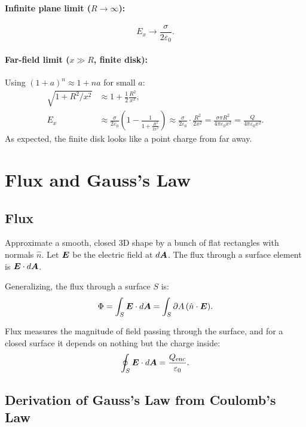 \begin{example}
\paragraph{Infinite plane limit ($R\to\infty$):}
\[
    E_x \to \frac{\sigma}{2\varepsilon_0}.
\]

\paragraph{Far-field limit ($x \gg R$, finite disk):}
Using $(1+a)^n \approx 1 + na$ for small $a$:
\begin{align*}
    \sqrt{1+R^2/x^2} &\approx 1 + \frac{1}{2}\frac{R^2}{x^2}, \\
    E_x &\approx \frac{\sigma}{2\varepsilon_0}\left(1 - \frac{1}{1 + \frac{R^2}{2x^2}}\right)
          \approx \frac{\sigma}{2\varepsilon_0}\cdot\frac{R^2}{2x^2}
          = \frac{\sigma \pi R^2}{4\pi\varepsilon_0 x^2}
          = \frac{Q}{4\pi\varepsilon_0 x^2}.
\end{align*}
As expected, the finite disk looks like a point charge from far away.
\end{example}

\section{Flux and Gauss's Law}

\subsection{Flux}

\begin{definition}
Approximate a smooth, closed 3D shape by a bunch of flat rectangles with normals $\hat{n}$. Let $\vect{E}$ be the electric field at $d\vect{A}$. The flux through a surface element is $\vect{E}\cdot d\vect{A}$.

Generalizing, the flux through a surface $S$ is:
\[
    \Phi = \int_S \vect{E}\cdot d\vect{A} = \int_S \partial A\,(\hat{n}\cdot\vect{E}).
\]
\end{definition}

Flux measures the magnitude of field passing through the surface, and for a closed surface it depends on nothing but the charge inside:
\[
    \oint_S \vect{E}\cdot d\vect{A} = \frac{Q_\text{enc}}{\varepsilon_0}.
\]

\subsection{Derivation of Gauss's Law from Coulomb's Law}

